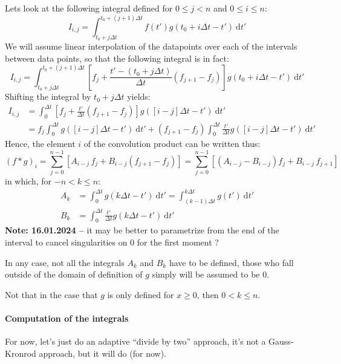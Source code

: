 \documentclass{article}
\newcommand{\dd}{\mathrm{d}}
\newcommand{\pa}[1]{\left(#1\right)}
\newcommand{\pab}[1]{\left[#1\right]}
\newcommand{\obs}[2]{\textbf{Note: #1 --} #2}
\begin{document}
Lets look at the following integral defined for $0\leq j < n$ and $0
\leq i \leq n$:
%
\begin{equation}
  I_{i,j} = 
  \int_{t_0 + j \Delta t}^{t_0 + (j+1) \Delta t}
  f(t') g(t_0 + i\Delta t-t')\:\dd t'
\end{equation}
%
We will assume linear interpolation of the datapoints over each of the
intervals between data points, so that the following integral is in
fact:
%
\begin{equation}
  I_{i,j}  =
\int_{t_0 + j \Delta t}^{t_0 + (j+1) \Delta t}
\pab{f_j + \frac{t' - \pa{t_0 + j \Delta t}}{\Delta t} \pa{f_{j+1} - f_j}}
g(t_0 + i\Delta t-t')\:\dd t'
\end{equation}
%
Shifting the integral by $t_0 + j\Delta t$ yields:
%
\begin{align}
  I_{i,j}  &=
  \int_{0}^{ \Delta t}
  \pab{f_j + \frac{t'}{\Delta t} \pa{f_{j+1} - f_j}}
  g(\pab{i-j}\Delta t -t')\:\dd t'\\
  & = f_j \int_{0}^{\Delta t} g(\pab{i-j}\Delta t -t')\:\dd t'
  + \pa{f_{j+1} - f_j}
  \int_{0}^{\Delta t}
  \frac{t'}{\Delta t} g(\pab{i-j}\Delta t -t')\:\dd t'
\end{align}
%
Hence, the element $i$ of the convolution product can be written thus:
%
\begin{equation}
  (f*g)_i = \sum_{j = 0}^{n-1}
  \pab{
    A_{i-j}\, f_j + B_{i-j}\pa{f_{j+1} - f_j}
  }
  =
  \sum_{j = 0}^{n-1}
  \pab{
    \pa{A_{i-j}- B_{i-j}}f_j + B_{i-j}\,f_{j+1}
  }
\end{equation}
%
in which, for $-n < k \leq n$:
%
\begin{align}
  A_k &= \int_{0}^{\Delta t} g(k\Delta t -t')\:\dd t' =
  \int_{\pa{k-1} \Delta t}^{k \Delta t} g(t') \:\dd t'\\[4mm]
  B_k &= \int_{0}^{\Delta t}
  \frac{t'}{\Delta t} g(k\Delta t - t')\:\dd t'
\end{align}
%
\obs{16.01.2024}{it may be better to parametrize from the end of
  the interval to cancel singularities on 0 for the first moment ?}

In any case, not all the integrals $A_k$ and $B_k$ have to be defined,
those who fall outside of the domain of definition of $g$ simply will
be assumed to be 0.

Not that in the case that $g$ is only defined for $x \geq 0$, then $0
< k \leq n$.

\paragraph{Computation of the integrals}
For now, let's just do an adaptive ``divide by two'' approach, it's
not a Gauss-Kronrod approach, but it will do (for now).
\end{document}

